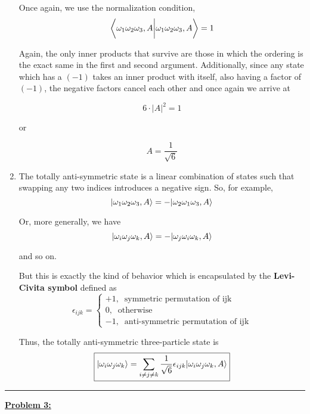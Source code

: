 \documentclass[twoside]{article}
\begin{document}
\begin{enumerate}
   Once again, we use the normalization condition,
   \[ \left\langle \omega_1 \omega_2 \omega_3, A \bigg\rvert \omega_1 \omega_2 \omega_3, A \right\rangle = 1 \]

   Again, the only inner products that survive are those in which the ordering is the exact same in the first and second argument. Additionally, since any state which has a $(-1)$ takes an inner product with itself, also having a factor of $(-1)$, the negative factors cancel each other and once again we arrive at 

   \[ 6 \cdot |A|^2 = 1 \]

   or 

   \[ \boxed{A = \frac{1}{\sqrt{6}}} \]

   \item The totally anti-symmetric state is a linear combination of states such that swapping any two indices introduces a negative sign. So, for example,
   \[ \rvert\omega_1 \omega_2 \omega_3, A\rangle = - \rvert\omega_2 \omega_1 \omega_3, A\rangle \]

   Or, more generally, we have 
   \[ \rvert\omega_i \omega_j \omega_k, A\rangle = - \rvert\omega_j \omega_i \omega_k, A\rangle  \]

   and so on.

   But this is exactly the kind of behavior which is encapsulated by the \textbf{Levi-Civita symbol} defined as 
   \[ \epsilon_{ijk} = \begin{cases}
      +1,\;\; \text{symmetric permutation of ijk}\\
      0,\;\; \text{otherwise}\\
      -1,\;\;\text{anti-symmetric permutation of ijk}
      \end{cases} \]

   Thus, the totally anti-symmetric three-particle state is 
   \[ \boxed{\rvert\omega_i \omega_j \omega_k\rangle = \sum_{i \neq j \neq k} \frac{1}{\sqrt{6}}\epsilon_{ijk} \rvert\omega_i \omega_j \omega_k, A\rangle } \]

\end{enumerate}

\vskip 0.5cm
\hrule
\vskip 0.5cm



\underline{\textbf{Problem 3:}}
\end{document}
